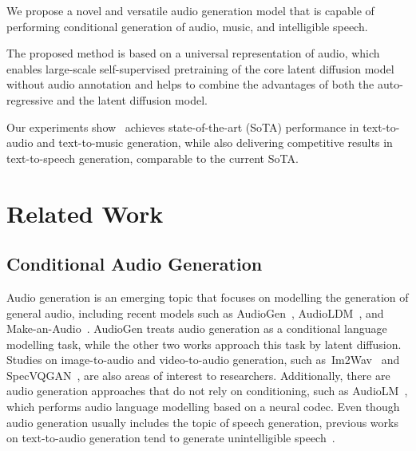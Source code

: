 \documentclass[lettersize,journal]{IEEEtran}
\begin{document}
\begin{list}{}{\leftmargin=1em}
    \item We propose a novel and versatile audio generation model that is capable of performing conditional generation of audio, music, and intelligible speech. 
    \item The proposed method is based on a universal representation of audio, which enables large-scale self-supervised pretraining of the core latent diffusion model without audio annotation and helps to combine the advantages of both the auto-regressive and the latent diffusion model. 
    \item Our experiments show \vModelName~achieves state-of-the-art (SoTA) performance in text-to-audio and text-to-music generation, while also delivering competitive results in text-to-speech generation, comparable to the current SoTA.
\end{list}

\section{Related Work}

\subsection{Conditional Audio Generation}

\noindent
Audio generation is an emerging topic that focuses on modelling the generation of general audio, including recent models such as AudioGen~\cite{kreuk2022audiogen}, AudioLDM~\cite{liu2023audioldm}, and Make-an-Audio~\cite{huang2023make-an-audio}. AudioGen treats audio generation as a conditional language modelling task, while the other two works approach this task by latent diffusion. Studies on image-to-audio and video-to-audio generation, such as~Im2Wav~\cite{sheffer2023hear} and SpecVQGAN~\cite{iashin2021taming-specvqgan}, are also areas of interest to researchers. Additionally, there are audio generation approaches that do not rely on conditioning, such as AudioLM~\cite{borsos2023audiolm}, which performs audio language modelling based on a neural codec. Even though audio generation usually includes the topic of speech generation, previous works on text-to-audio generation tend to generate unintelligible speech~\cite{yang2022diffsound,liu2023audioldm,kreuk2022audiogen,huang2023make-an-audio}.
\end{document}
